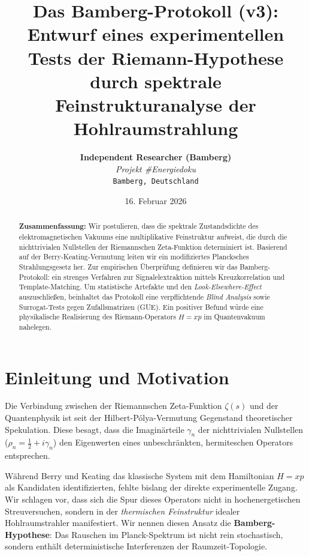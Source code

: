 \documentclass[11pt, a4paper]{article}
\title{\textbf{Das Bamberg-Protokoll (v3):}\\ Entwurf eines experimentellen Tests der Riemann-Hypothese durch spektrale Feinstrukturanalyse der Hohlraumstrahlung}
\author{
	\textbf{Independent Researcher (Bamberg)} \\
	\textit{Projekt \#Energiedoku} \\
	\texttt{Bamberg, Deutschland}
}
\date{16. Februar 2026}
\begin{document}
	
	\maketitle
	
	\begin{abstract}
		\noindent
		\textbf{Zusammenfassung:} Wir postulieren, dass die spektrale Zustandsdichte des elektromagnetischen Vakuums eine multiplikative Feinstruktur aufweist, die durch die nichttrivialen Nullstellen der Riemannschen Zeta-Funktion determiniert ist. Basierend auf der Berry-Keating-Vermutung leiten wir ein modifiziertes Plancksches Strahlungsgesetz her. Zur empirischen Überprüfung definieren wir das \glqq Bamberg-Protokoll\grqq: ein strenges Verfahren zur Signalelextraktion mittels Kreuzkorrelation und Template-Matching. Um statistische Artefakte und den \textit{Look-Elsewhere-Effect} auszuschließen, beinhaltet das Protokoll eine verpflichtende \textit{Blind Analysis} sowie Surrogat-Tests gegen Zufallsmatrizen (GUE). Ein positiver Befund würde eine physikalische Realisierung des Riemann-Operators $H=xp$ im Quantenvakuum nahelegen.
	\end{abstract}
	
	\tableofcontents
	\newpage
	
	\section{Einleitung und Motivation}
	
	Die Verbindung zwischen der Riemannschen Zeta-Funktion $\zeta(s)$ und der Quantenphysik ist seit der Hilbert-Pólya-Vermutung Gegenstand theoretischer Spekulation. Diese besagt, dass die Imaginärteile $\gamma_n$ der nichttrivialen Nullstellen ($\rho_n = \frac{1}{2} + i\gamma_n$) den Eigenwerten eines unbeschränkten, hermiteschen Operators entsprechen. 
	
	Während Berry und Keating \cite{berry1999} das klassische System mit dem Hamiltonian $H=xp$ als Kandidaten identifizierten, fehlte bislang der direkte experimentelle Zugang. Wir schlagen vor, dass sich die Spur dieses Operators nicht in hochenergetischen Streuversuchen, sondern in der \textit{thermischen Feinstruktur} idealer Hohlraumstrahler manifestiert.
	Wir nennen diesen Ansatz die \textbf{Bamberg-Hypothese}: Das Rauschen im Planck-Spektrum ist nicht rein stochastisch, sondern enthält deterministische Interferenzen der Raumzeit-Topologie.
	
\end{document}

